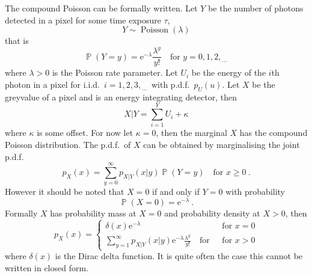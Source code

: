 \documentclass[12pt, a4paper]{memoir}
\DeclareMathOperator{\prob}{\mathbb{P}}
\DeclareMathOperator{\poisson}{Poisson}
\newcommand{\euler}{\mathrm{e}}
\newcommand{\dotdotdot}{_{\phantom{.}\cdots}}
\begin{document}
The compound Poisson can be formally written. Let $Y$ be the number of photons detected in a pixel for some time exposure $\tau$,
\begin{equation*}
Y\sim\poisson(\lambda)
\end{equation*}
that is
\begin{equation*}
\prob(Y=y)=\euler^{-\lambda}\frac{\lambda^y}{y!} \quad \text{for }y=0,1,2,\dotdotdot
\end{equation*}
where $\lambda>0$ is the Poisson rate parameter. Let $U_i$ be the energy of the $i$th photon in a pixel for i.i.d.~$i=1,2,3,\dotdotdot$ with p.d.f.~$p_U(u)$. Let $X$ be the greyvalue of a pixel and is an energy integrating detector, then
\begin{equation}
X|Y = \sum_{i=1}^{Y}U_i+\kappa
\label{eq:compoundPoisson_X|Y}
\end{equation}
where $\kappa$ is some offset. For now let $\kappa=0$, then the marginal $X$ has the compound Poisson distribution. The p.d.f.~of $X$ can be obtained by marginalising the joint p.d.f.
\begin{equation*}
p_X(x)=\sum_{y=0}^\infty p_{X|Y}(x|y)\prob(Y=y) \quad\text{for }x\geqslant 0\ .
\end{equation*}
However it should be noted that $X=0$ if and only if $Y=0$ with probability
\begin{equation*}
\prob(X=0)=\euler^{-\lambda} \ .
\end{equation*}
Formally $X$ has probability mass at $X=0$ and probability density at $X>0$, then 
\begin{equation}
p_X(x) = 
\begin{cases}
\delta(x) \euler^{-\lambda}  & \text{ for } x=0 \\ 
\sum_{y=1}^\infty p_{X|Y}(x|y)\euler^{-\lambda}\frac{\lambda^y}{y!} \quad\text{for } & \text{ for } x>0
\end{cases}
\end{equation}
where $\delta(x)$ is the Dirac delta function. It is quite often the case this cannot be written in closed form.
\end{document}
